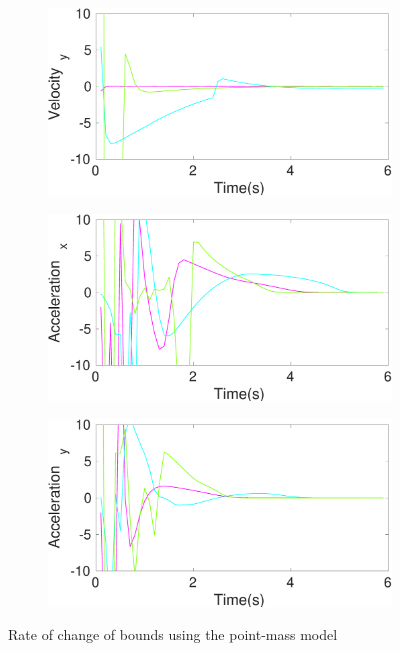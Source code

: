 \begin{figure}[!h]
\begin{subfigure}{.5\linewidth}
\end{subfigure}
\begin{subfigure}{.5\linewidth}
\centering
\includegraphics[width=\linewidth]{figures/BoundChange/PM/pm_bound_changeVelocity_y}
\end{subfigure}
\begin{subfigure}{.5\linewidth}
\centering
\includegraphics[width=\linewidth]{figures/BoundChange/PM/pm_bound_changeAcceleration_x}
\end{subfigure}
\begin{subfigure}{.5\linewidth}
\centering
\includegraphics[width=\linewidth]{figures/BoundChange/PM/pm_bound_changeAcceleration_y}
\end{subfigure}
\caption{Rate of change of bounds using the point-mass model}
\end{figure}
\pagebreak
